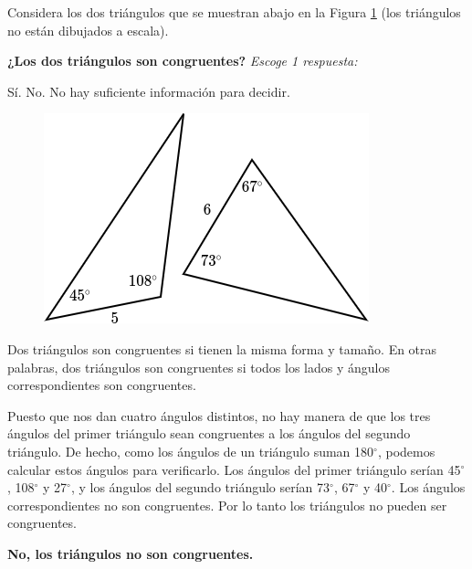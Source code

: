 Considera los dos triángulos que se muestran abajo en la Figura \ref{fig:20230323153510} (los triángulos no están dibujados a escala).

\begin{minipage}{0.6\textwidth}
    \textbf{¿Los dos triángulos son congruentes?}
    \emph{Escoge 1 respuesta:}

    \begin{choices}
        \choice Sí.
        \CorrectChoice No.
        \choice No hay suficiente información para decidir.
    \end{choices}
\end{minipage}%
\begin{minipage}{0.35\textwidth}
    \begin{figure}[H]
        \centering
        \includegraphics[width=\linewidth]{../images/20230323153510}
        \caption{}
        \label{fig:20230323153510}
    \end{figure}
\end{minipage}

\begin{solutionbox}{3cm}\footnotesize
    Dos triángulos son congruentes si tienen la misma forma y tamaño. En otras palabras, dos triángulos son congruentes si todos los lados y ángulos correspondientes son congruentes.

    Puesto que nos dan cuatro ángulos distintos, no hay manera de que los tres ángulos del primer triángulo sean congruentes a los ángulos del segundo triángulo.
    De hecho, como los ángulos de un triángulo suman 180$^\circ$, podemos calcular estos ángulos para verificarlo. Los ángulos del primer triángulo serían 45$^\circ$, 108$^\circ$ y 27$^\circ$, y los ángulos del segundo triángulo serían 73$^\circ$, 67$^\circ$ y 40$^\circ$.
    Los ángulos correspondientes no son congruentes. Por lo tanto los triángulos no pueden ser congruentes.

    \textbf{No, los triángulos no son congruentes.}
\end{solutionbox}